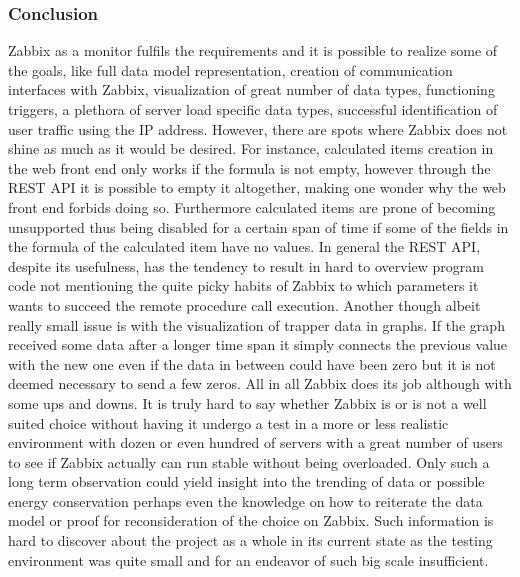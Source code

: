 \subsubsection{Conclusion}
	Zabbix as a monitor fulfils the requirements and it is possible to realize some of the goals, like full data model representation, creation of communication interfaces with Zabbix, visualization of great number of data types, functioning triggers, a plethora of server load specific data types, successful identification of user traffic using the IP address. However, there are spots where Zabbix does not shine as much as it would be desired. For instance, calculated items creation in the web front end only works if the formula is not empty, however through the REST API it is possible to empty it altogether, making one wonder why the web front end forbids doing so. Furthermore calculated items are prone of becoming unsupported thus being disabled for a certain span of time if some of the fields in the formula of the calculated item have no values. In general the REST API, despite its usefulness, has the tendency to result in hard to overview program code not mentioning the quite picky habits of Zabbix to which parameters it wants to succeed the remote procedure call execution. Another though albeit really small issue is with the visualization of trapper data in graphs. If the graph received some data after a longer time span it simply connects the previous value with the new one even if the data in between could have been zero but it is not deemed necessary to send a few zeros.
	All in all Zabbix does its job although with some ups and downs. It is truly hard to say whether Zabbix is or is not a well suited choice without having it undergo a test in a more or less realistic environment with dozen or even hundred of servers with a great number of users to see if Zabbix actually can run stable without being overloaded. Only such a long term observation could yield insight into the trending of data or possible energy conservation perhaps even the knowledge on how to reiterate the data model or proof for reconsideration of the choice on Zabbix. Such information is hard to discover about the project as a whole in its current state as the testing environment was quite small and for an endeavor of such big scale insufficient.